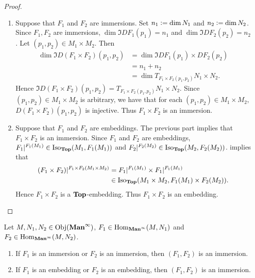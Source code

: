 \documentclass{book}
\begin{document}
\begin{proof}\
	\begin{enumerate}
		\item Suppose that $F_1$ and $F_2$ are immersions. Set $n_1 \vcentcolon= \dim N_1$ and $n_2 \vcentcolon= \dim N_2$. Since $F_1, F_2$ are immersions, $\dim \Im DF_1(p_1) = n_1$ and $\dim \Im DF_2(p_2) = n_2$. Let $(p_1, p_2) \in M_1 \times M_2$. Then 
		\begin{align*}
			\dim \Im D(F_1 \times F_2)(p_1, p_2)
			& = \dim \Im DF_1(p_1) \times  DF_2(p_2) \\
			& = n_1 + n_2 \\
			& = \dim T_{F_1 \times F_2(p_1, p_2)} N_1 \times N_2.
		\end{align*} 
		Hence $\Im D(F_1 \times F_2)(p_1, p_2) = T_{F_1 \times F_2(p_1, p_2)} N_1 \times N_2$. Since $(p_1, p_2) \in M_1 \times M_2$ is arbitrary, we have that for each $(p_1, p_2) \in M_1 \times M_2$, $D(F_1 \times F_2)(p_1, p_2)$ is injective. Thus $F_1 \times F_2$ is an immersion.
		\item Suppose that $F_1$ and $F_2$ are embeddings. The previous part implies that $F_1 \times F_2$ is an immersion. Since $F_1$ and $F_2$ are embeddings, $F_1|^{F_1(M_1)} \in \operatorname{Iso}_{\operatorname*{\text{\textbf{Top}}}}(M_1, F_1(M_1))$ and $F_2|^{F_2(M_2)} \in \operatorname{Iso}_{\operatorname*{\text{\textbf{Top}}}}(M_2, F_2(M_2))$. \rex{}  implies that 
		\begin{align*}
			(F_1 \times F_2)|^{F_1 \times F_2(M_1 \times M_2)} 
			& = F_1|^{F_1(M_1)} \times F_1|^{F_1(M_1)} \\
			& \in \operatorname{Iso}_{\operatorname*{\text{\textbf{Top}}}}( M_1 \times M_2, F_1(M_1) \times F_2(M_2)).
		\end{align*}
		Hence $F_1 \times F_2$ is a $\operatorname*{\text{\textbf{Top}}}$-embedding. Thus $F_1 \times F_2$ is an embedding.
	\end{enumerate}
\end{proof}

\begin{ex} 
	Let $M, N_1, N_2 \in \operatorname{Obj}(\operatorname*{\text{\textbf{Man}}^{\infty}})$, $F_1 \in \operatorname{Hom}_{\operatorname*{\text{\textbf{Man}}^{\infty}}}(M, N_1)$ and $F_2 \in \operatorname{Hom}_{\operatorname*{\text{\textbf{Man}}^{\infty}}}(M, N_2)$. 
	\begin{enumerate}
		\item If $F_1$ is an immersion or $F_2$ is an immersion, then $(F_1, F_2)$ is an immersion. 
		\item If $F_1$ is an embedding or $F_2$ is an embedding, then $(F_1, F_2)$ is an immersion. 
	\end{enumerate}
\end{ex}
\end{document}
